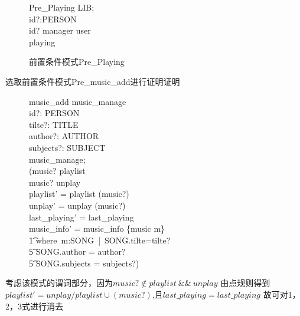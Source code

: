 \documentclass[14pt]{article}
\numberwithin{figure}{subsection}
\begin{document}
\vspace{-1cm}
\begin{figure}[H]
    \setlength{\abovecaptionskip}{0.cm}
    \setlength{\belowcaptionskip}{0.cm}
    \begin{schema}{Pre\_Playing}
        LIB;\\
        id?:PERSON\\
        \where
        id? \in \ran manager \cup user\\
        \dom playing \neq \emptyset
    \end{schema}
    \caption{前置条件模式Pre\_Playing}
\end{figure}
\clearpage
选取前置条件模式Pre\_music\_add进行证明证明
\vspace{-0.7cm}
\begin{figure}[H]
    \setlength{\abovecaptionskip}{0.cm}
    \setlength{\belowcaptionskip}{0.cm}
    \begin{schema}{music\_add}
        music\_manage\\
        id?: \power PERSON\\
        tilte?: TITLE\\
        author?: \finset AUTHOR\\
        subjects?: \finset SUBJECT\\
        \where
        \exists music\_manage;\ \bullet \\
        (music? \not\in playlist\\
        music? \not\in unplay\\
        playlist' = playlist \cup (music?)\\
        unplay' = unplay \cup (music?)\\
        last\_playing' = last\_playing\\
        music\_info' = music\_info \oplus \{music \mapsto m\}\\
        \t1 where\ m:SONG\ |\ SONG.tilte=tilte?\\
        \t5 \quad SONG.author = author?\\
        \t5 \quad SONG.subjects = subjects?)
    \end{schema}
\end{figure}
\vspace{-0.7CM}
考虑该模式的谓词部分，因为$music? \not\in playlist\ \&\&\ unplay$ 由点规则得到
$playlist' = unplay/playlist \cup (music?)$,且$last\_playing=last\_playing$
故可对1，2，3式进行消去
\vspace{-0.7cm}
\end{document}
